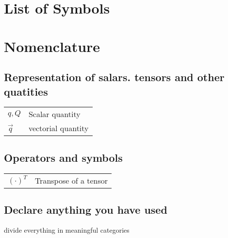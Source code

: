 \section*{List of Symbols}
\section*{Nomenclature}\label{sec:nomenclature}
\subsection*{Representation of salars. tensors and other quatities}
\begin{tabular}{l l}
$q,Q$ &Scalar quantity  \\
$\vec{q}$ &vectorial quantity
\end{tabular}


\subsection*{Operators and symbols}
\begin{tabular}{l l}
$(\cdot)^T$ &Transpose of a tensor
\end{tabular}


\subsection*{Declare anything you have used}
divide everything in meaningful categories